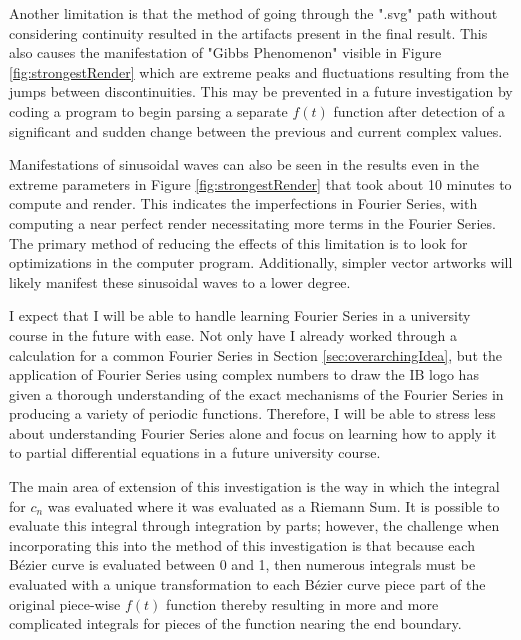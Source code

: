 \documentclass[letterpaper, 12pt]{article}
\begin{document}
Another limitation is that the method of
going through the ".svg" path without
considering continuity resulted in the artifacts present
in the final result. This also causes the manifestation
of "Gibbs Phenomenon" visible in Figure \ref*{fig:strongestRender}
which are extreme peaks and fluctuations resulting from
the jumps between discontinuities.
This may be
prevented in a future investigation
by coding a program to begin
parsing a separate \(f(t)\) function
after detection of a significant and sudden
change between the previous and current
complex values.

Manifestations of sinusoidal waves can also be
seen in the results even in the extreme parameters
in Figure \ref*{fig:strongestRender} that took
about 10 minutes to compute and render.
This indicates the imperfections in
Fourier Series, with computing
a near perfect render necessitating
more terms in the Fourier Series.
The primary method of reducing the
effects of this limitation is to
look for optimizations in the computer program.
Additionally, simpler vector artworks
will likely manifest these sinusoidal waves
to a lower degree.

I expect that I will be able to handle learning
Fourier Series in a university course
in the future with ease. Not only have I
already worked through a calculation for
a common Fourier Series in Section \ref*{sec:overarchingIdea},
but the application of Fourier Series
using complex numbers to draw the IB logo
has given a thorough understanding
of the exact mechanisms of the Fourier
Series in producing a variety of
periodic functions. Therefore,
I will be able to stress less about
understanding Fourier Series alone
and focus on learning how to
apply it to partial differential equations
in a future university course.

The main area of extension of this investigation
is the way in which the integral for \(c_n\) was
evaluated where it was evaluated as a Riemann Sum.
It is possible to evaluate this integral through
integration by parts; however, the challenge
when incorporating this into the method of this investigation
is that because each Bézier curve is evaluated
between 0 and 1, then numerous integrals
must be evaluated with a unique transformation
to each Bézier curve piece part of the original
piece-wise \(f(t)\) function thereby resulting
in more and more complicated integrals
for pieces of the function nearing the end boundary.



\end{document}
